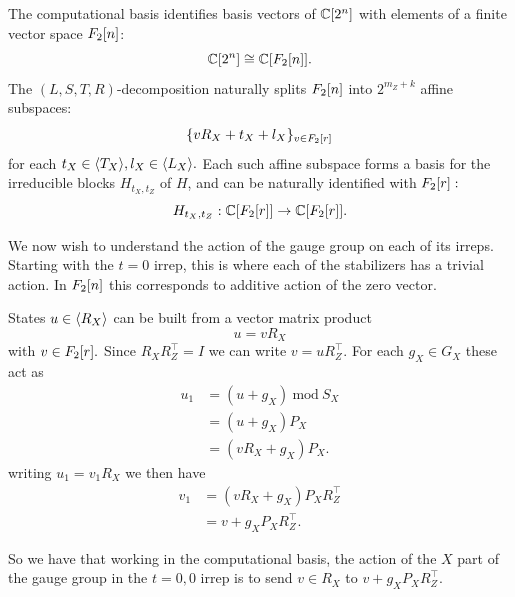 \documentclass[12pt]{article}
\renewenvironment{framed}[1][\hsize]{%
\def\FrameCommand{{\color{black}\vrule width 3pt}\hspace{0pt}\fboxsep=\FrameSep\colorbox{lightgray}}%
\MakeFramed{\hsize0.8\linewidth\advance\hsize-\width\FrameRestore}}
{\endMakeFramed}
\begin{document}
\begin{framed}
The computational basis identifies
basis vectors of $\mathbb{C}[2^n]$
with elements of a finite vector space $F_2[n]$:
$$
    \mathbb{C}[2^n] \cong \mathbb{C}[F_2[n]].
$$
The $(L,S,T,R)$-decomposition naturally
splits $F_2[n]$ into $2^{m_Z+k}$ affine subspaces:
$$
    \{ v R_X + t_X + l_X \}_{v\in F_2[r]}
$$
for each $t_X \in \langle T_X \rangle, l_X \in \langle L_X \rangle.$
Each such affine subspace forms a basis
for the irreducible blocks $H_{t_X,t_Z}$ of $H$,
and can be naturally identified with $F_2[r]:$
$$
    H_{t_X,t_Z} : \mathbb{C}[F_2[r]] \to \mathbb{C}[F_2[r]].
$$
\end{framed}

We now wish to understand the action of the
gauge group on each of its irreps.
Starting with the $t=0$ irrep,
this is where each of the stabilizers has
a trivial action. 
In $F_2[n]$ this
corresponds to additive action of the zero vector.

States $u\in\langle R_X \rangle$ can be built from a
vector matrix product
$$
    u = v R_X
$$
with $v\in F_2[r].$
Since $R_X R_Z^\top = I$
we can write $v = u R_Z^\top.$
For each $g_X\in G_X$ these act as
\begin{align*}
    u_1 &= (u + g_X) \ \mbox{mod}\  S_X \\
        &= (u + g_X) P_X \\
        &= (v R_X + g_X) P_X.
\end{align*}
writing $u_1 = v_1 R_X$ we then have
\begin{align*}
    v_1 &= (v R_X + g_X) P_X R_Z^\top \\
        &= v + g_X P_X R_Z^\top.
\end{align*}

So we have that working in the computational
basis, the action of the $X$ part of the
gauge group in the $t=0,0$ irrep is to send
$v\in R_X$ to 
$v + g_X P_X R_Z^\top.$

%

\end{document}
